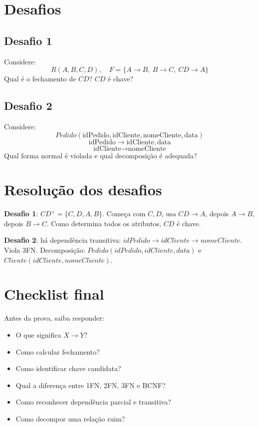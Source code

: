 \documentclass[12pt,a4paper]{article}
\begin{document}
\section{Desafios}
\subsection*{Desafio 1}
Considere:
\[
R(A,B,C,D),\quad F=\{A\rightarrow B,\ B\rightarrow C,\ CD\rightarrow A\}
\]
Qual é o fechamento de $CD$? $CD$ é chave?

\subsection*{Desafio 2}
Considere:
\[
Pedido(\text{idPedido},\text{idCliente},\text{nomeCliente},\text{data})
\]
\[
\text{idPedido}\rightarrow \text{idCliente},\text{data}
\]
\[
\text{idCliente}\rightarrow \text{nomeCliente}
\]
Qual forma normal é violada e qual decomposição é adequada?

\section{Resolução dos desafios}
\textbf{Desafio 1}: $CD^+ = \{C,D,A,B\}$. Começa com $C,D$, usa $CD\rightarrow A$, depois $A\rightarrow B$, depois $B\rightarrow C$. Como determina todos os atributos, $CD$ é chave.

\textbf{Desafio 2}: há dependência transitiva: $idPedido\rightarrow idCliente\rightarrow nomeCliente$. Viola 3FN. Decomposição: $Pedido(idPedido,idCliente,data)$ e $Cliente(idCliente,nomeCliente)$.

\section{Checklist final}
Antes da prova, saiba responder:
\begin{itemize}
    \item O que significa $X\rightarrow Y$?
    \item Como calcular fechamento?
    \item Como identificar chave candidata?
    \item Qual a diferença entre 1FN, 2FN, 3FN e BCNF?
    \item Como reconhecer dependência parcial e transitiva?
    \item Como decompor uma relação ruim?
\end{itemize}
\end{document}
